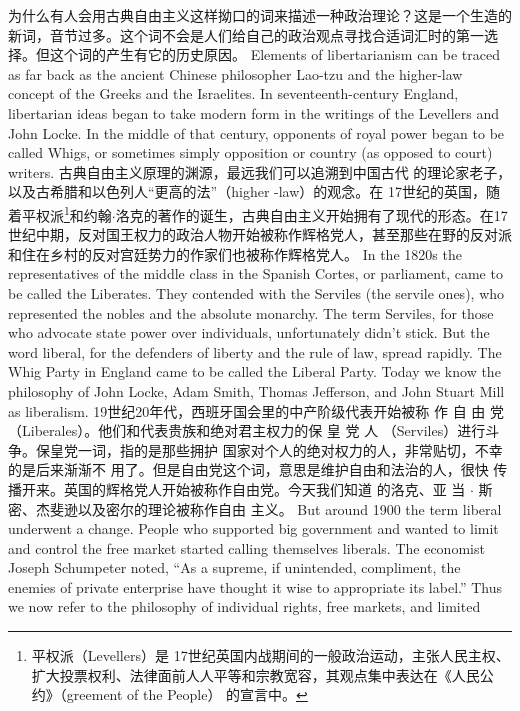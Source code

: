 \begin{paracol}{2}
\switchcolumn
为什么有人会用古典自由主义这样拗口的词来描述一种政治理论？这是一个生造的新词，音节过多。这个词不会是人们给自己的政治观点寻找合适词汇时的第一选择。但这个词的产生有它的历史原因。
\switchcolumn*
Elements of libertarianism can be traced as far back as the
ancient Chinese philosopher Lao-tzu and the higher-law concept of the Greeks and the Israelites. In seventeenth-century
England, libertarian ideas began to take modern form in the
writings of the Levellers and John Locke. In the middle of that
century, opponents of royal power began to be called Whigs, or
sometimes simply opposition or country (as opposed to court)
writers.
\switchcolumn
古典自由主义原理的渊源，最远我们可以追溯到中国古代
的理论家老子，以及古希腊和以色列人“更高的法”（higher
-law）的观念。在 17世纪的英国，随着平权派\footnote{平权派（Levellers）是 17世纪英国内战期间的一般政治运动，主张人民主权、扩大投票权利、法律面前人人平等和宗教宽容，其观点集中表达在《人民公约》（greement of the People） 的宣言中。}和约翰$\cdot$洛克的著作的诞生，古典自由主义开始拥有了现代的形态。在17世纪中期，反对国王权力的政治人物开始被称作辉格党人，甚至那些在野的反对派和住在乡村的反对宫廷势力的作家们也被称作辉格党人。
\switchcolumn
In the 1820s the representatives of the middle class in the
Spanish Cortes, or parliament, came to be called the Liberates.
They contended with the Serviles (the servile ones), who represented the nobles and the absolute monarchy. The term
Serviles, for those who advocate state power over individuals,
unfortunately didn't stick. But the word liberal, for the defenders of liberty and the rule of law, spread rapidly. The Whig
Party in England came to be called the Liberal Party. Today we
know the philosophy of John Locke, Adam Smith, Thomas Jefferson, and John Stuart Mill as liberalism.
\switchcolumn
19世纪20年代，西班牙国会里的中产阶级代表开始被称
作 自 由 党 （Liberales）。他们和代表贵族和绝对君主权力的保
皇 党 人 （Serviles）进行斗争。保皇党一词，指的是那些拥护
国家对个人的绝对权力的人，非常贴切，不幸的是后来渐渐不
用了。但是自由党这个词，意思是维护自由和法治的人，很快
传播开来。英国的辉格党人开始被称作自由党。今天我们知道
的洛克、亚 当 $\cdot$ 斯密、杰斐逊以及密尔的理论被称作自由
主义。
\switchcolumn*
But around 1900 the term liberal underwent a change. People who supported big government and wanted to limit and
control the free market started calling themselves liberals. The
economist Joseph Schumpeter noted, ``As a supreme, if unintended, compliment, the enemies of private enterprise have
thought it wise to appropriate its label.'' Thus we now refer to
the philosophy of individual rights, free markets, and limited

\end{paracol}
